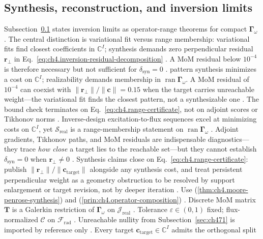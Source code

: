\subsection{Synthesis, reconstruction, and inversion limits}
\label{sec:ch473}
Subsection~\ref{sec:ch473} states inversion limits as operator-range theorems for compact \(\boldsymbol{\Gamma}_\omega\) \cite{hansen1988}. The
central distinction is variational fit versus range membership: variational fits find closest coefficients in \(\mathbb{C}^{I}\); synthesis demands zero
perpendicular residual \(\mathbf{r}_{\perp}\) in Eq.~\eqref{eq:ch4.inversion-residual-decomposition} \cite{stratton1941}. A MoM
residual below \(10^{-4}\) is therefore necessary but not sufficient for \(\delta_{\mathrm{syn}}=0\) \cite{devaney2004}.
pattern synthesis minimizes a cost on $\mathbb{C}^{I}$; realizability demands membership in $\operatorname{ran}\boldsymbol{\Gamma}_\omega$. A MoM residual of $10^{-4}$ can coexist with $\|\mathbf{r}_\perp\|/\|\mathbf{c}\|=0.15$ when the target carries unreachable weight---the variational fit finds the closest pattern, not a synthesizable one \cite{stratton1941}. The bound check terminates on Eq.~\eqref{eq:ch4.range-certificate}, not on adjoint scores or Tikhonov norms \cite{hansen1988}.
\medskip
Inverse-design excitation-to-flux sequences excel at minimizing costs on $\mathbb{C}^{I}$, yet $\mathcal{S}_{\mathrm{real}}$ is a range-membership statement on $\operatorname{ran}\boldsymbol{\Gamma}_\omega$ \cite{stratton1941}. Adjoint gradients, Tikhonov paths, and MoM residuals are indispensable diagnostics---they trace \emph{how close} a target lies to the reachable set---but they cannot establish $\delta_{\mathrm{syn}}=0$ when $\mathbf{r}_\perp\neq0$ \cite{hansen1988}.
Synthesis claims close on Eq.~\eqref{eq:ch4.range-certificate}: publish $\|\mathbf{r}_\perp\|/\|\mathbf{c}_{\mathrm{target}}\|$ alongside any synthesis cost, and treat persistent perpendicular weight as a geometry obstruction to be resolved by support enlargement or target revision, not by deeper iteration \cite{devaney2004}.
Use (\ref{thm:ch4.moore-penrose-synthesis}) and (\ref{prin:ch4.operator-composition}) \cite{harrington2001}.
Discrete MoM matrix \(\mathbf{T}\) is a Galerkin restriction of \(\boldsymbol{\Gamma}_\omega\) on \(\mathcal{J}_{\mathrm{real}}\) \cite{harrington2001}.
Tolerance \(\varepsilon\in(0,1)\) fixed; flux-normalized \(\mathcal{C}\) on \(\mathcal{F}_{\mathrm{rad}}\) \cite{hansen1988}. Unreachable
nullity from Subsection~\ref{sec:ch471} is imported by reference only \cite{devaney2004}.
Every target \(\mathbf{c}_{\mathrm{target}}\in\mathbb{C}^{I}\) admits the orthogonal split
